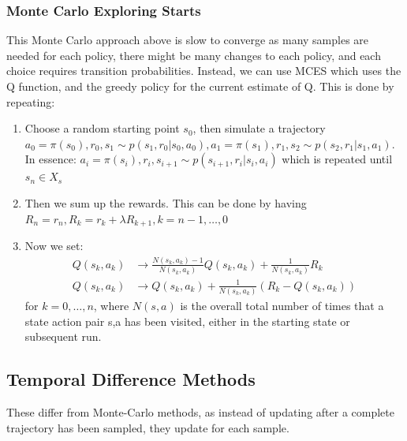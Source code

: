 \documentclass{article}
\begin{document}
\subsubsection*{Monte Carlo Exploring Starts}
This Monte Carlo approach above is slow to converge as many samples are needed for each policy, there might be many changes to each policy, and each choice requires transition probabilities. Instead, we can use MCES which uses the Q function, and the greedy policy for the current estimate of Q. This is done by repeating:
\begin{enumerate}
     \item Choose a random starting point $s_0$, then simulate a trajectory $a_0 = \pi(s_0), r_0, s_1 \sim p(s_1,r_0|s_0,a_0), a_1 = \pi(s_1),r_1, s_2 \sim p(s_2,r_1 |s_1,a_1)$.  \\
    In essence:
    $a_i = \pi(s_i),r_i,s_{i+1} \sim p(s_{i+1}, r_i | s_i,a_i)$ which is repeated until $s_n \in X_s$
    \item Then we sum up the rewards. This can be done by having $R_n = r_n, R_k = r_k + \lambda R_{k+1}, k=n-1, \hdots, 0$
    \item Now we set:
    \[
    \begin{aligned}
    Q(s_k,a_k) &\rightarrow \frac{N(s_k,a_k) -1}{N(s_k,a_k)} Q(s_k,a_k) + \frac{1}{N(s_k,a_k)}R_k \\
    Q(s_k,a_k) &\rightarrow Q(s_k,a_k) + \frac{1}{N(s_k,a_k)} (R_k - Q(s_k,a_k))     
    \end{aligned}
    \]
    for $k=0, \hdots,n$, where $N(s,a)$ is the overall total number of times that a state action pair s,a has been visited, either in the starting state or subsequent run.
\end{enumerate}
\subsection{Temporal Difference Methods}
These differ from Monte-Carlo methods, as instead of updating after a complete trajectory has been sampled, they update for each sample.
\end{document}
